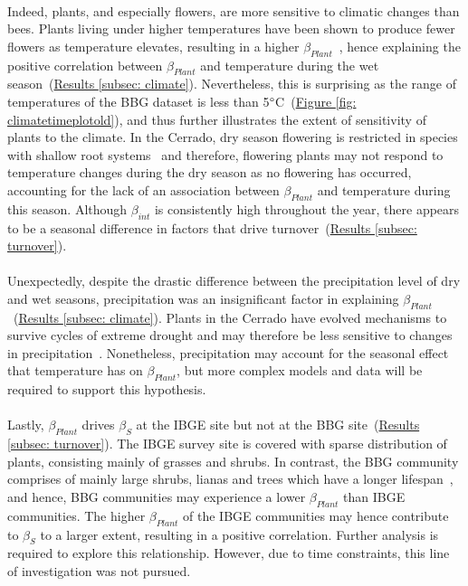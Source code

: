 \documentclass[11pt]{article}
\begin{document}
\\
Indeed, plants, and especially flowers, are more sensitive to climatic changes than bees. Plants living under higher temperatures have been shown to produce fewer flowers as temperature elevates, resulting in a higher $\beta_{Plant}$~\citep{Scaven2013}, hence explaining the positive correlation between $\beta_{Plant}$ and temperature during the wet season~(\hyperref[subsec: climate]{Results \ref{subsec: climate}}). Nevertheless, this is surprising as the range of temperatures of the BBG dataset is less than 5$\degree$C~(\hyperref[fig: climatetimeplotold]{Figure \ref{fig: climatetimeplotold}}), and thus further illustrates the extent of sensitivity of plants to the climate. In the Cerrado, dry season flowering is restricted in species with shallow root systems~\citep{Oliveira2002, Gottsberger2006} and therefore, flowering plants may not respond to temperature changes during the dry season as no flowering has occurred, accounting for the lack of an association between $\beta_{Plant}$ and temperature during this season. Although $\beta_{int}$ is consistently high throughout the year, there appears to be a seasonal difference in factors that drive turnover~(\hyperref[subsec: turnover]{Results \ref{subsec: turnover}}).\\
\\
Unexpectedly, despite the drastic difference between the precipitation level of dry and wet seasons, precipitation was an insignificant factor in explaining $\beta_{Plant}$~(\hyperref[subsec: climate]{Results \ref{subsec: climate}}). Plants in the Cerrado have evolved mechanisms to survive cycles of extreme drought and may therefore be less sensitive to changes in precipitation~\citep{Oliveira2002, Gottsberger2006}. Nonetheless, precipitation may account for the seasonal effect that temperature has on $\beta_{Plant}$, but more complex models and data will be required to support this hypothesis. \\
\\
Lastly, $\beta_{Plant}$ drives $\beta_{S}$ at the IBGE site but not at the BBG site~(\hyperref[subsec: turnover]{Results \ref{subsec: turnover}}). The IBGE survey site is covered with sparse distribution of plants, consisting mainly of grasses and shrubs. In contrast, the BBG community comprises of mainly large shrubs, lianas and trees which have a longer lifespan~\citep{Eiten1972}, and hence, BBG communities may experience a lower $\beta_{Plant}$ than IBGE communities. The higher $\beta_{Plant}$ of the IBGE communities may hence contribute to $\beta_{S}$ to a larger extent, resulting in a positive correlation. Further analysis is required to explore this relationship. However, due to time constraints, this line of investigation was not pursued. 
\end{document}
